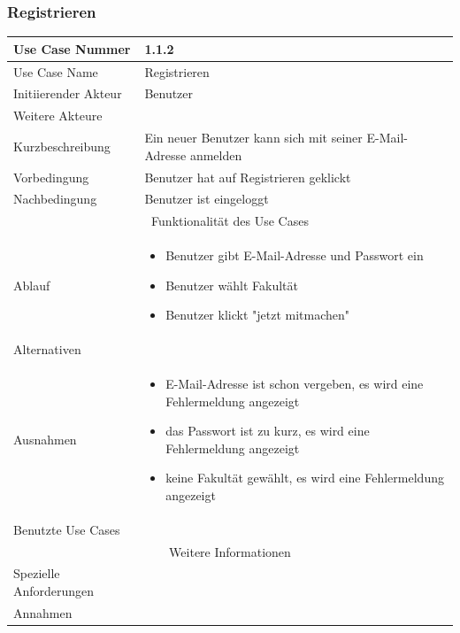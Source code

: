 \documentclass[10pt,a4paper]{article}
\begin{document}
\subsubsection{Registrieren}
	\begin{tabularx}{\textwidth}{|l|X|}
	\hline Use Case Nummer & 1.1.2 \\ 
	\hline Use Case Name & Registrieren \\ 
	\hline Initiierender Akteur & Benutzer \\
	\hline Weitere Akteure &  \\
	\hline Kurzbeschreibung & Ein neuer Benutzer kann sich mit seiner E-Mail-Adresse anmelden \\
	\hline Vorbedingung & Benutzer hat auf Registrieren geklickt \\
	\hline Nachbedingung & Benutzer ist eingeloggt \\
	\hline \multicolumn{2}{|c|}{Funktionalität des Use Cases}\\
	\hline Ablauf & \begin{itemize}
		\item Benutzer gibt E-Mail-Adresse und Passwort ein
		\item Benutzer w\"ahlt Fakult\"at
		\item Benutzer klickt "jetzt mitmachen"
	\end{itemize} \\
	\hline Alternativen &  \\
	\hline Ausnahmen & \begin{itemize}
		\item E-Mail-Adresse ist schon vergeben, es wird eine Fehlermeldung angezeigt
		\item das Passwort ist zu kurz, es wird eine Fehlermeldung angezeigt
		\item keine Fakult\"at gewählt, es wird eine Fehlermeldung angezeigt
	\end{itemize} \\
	\hline Benutzte Use Cases &  \\
	\hline \multicolumn{2}{|c|}{Weitere Informationen} \\
	\hline Spezielle Anforderungen &  \\
	\hline Annahmen &  \\
	\hline
	\end{tabularx} 
		
\end{document}
